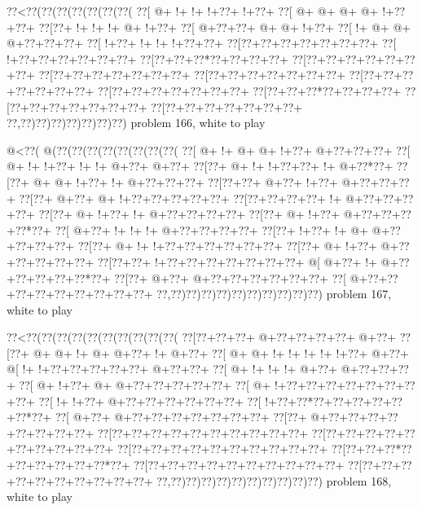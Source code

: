 \vbox{\vbox{\goo
\0??<\0??(\0??(\0??(\0??(\0??(\0??(\0??(
\0??[\- @+\- !+\- !+\- !+\0??+\- !+\0??+
\0??[\- @+\- @+\- @+\- @+\- !+\0??+\0??+
\0??[\0??+\- !+\- !+\- !+\- @+\- !+\0??+
\0??[\- @+\0??+\0??+\- @+\- @+\- !+\0??+
\0??[\- !+\- @+\- @+\- @+\0??+\0??+\0??+
\0??[\- !+\0??+\- !+\- !+\- !+\0??+\0??+
\0??[\0??+\0??+\0??+\0??+\0??+\0??+\0??+
\0??[\- !+\0??+\0??+\0??+\0??+\0??+\0??+
\0??[\0??+\0??+\0??*\0??+\0??+\0??+\0??+
\0??[\0??+\0??+\0??+\0??+\0??+\0??+\0??+
\0??[\0??+\0??+\0??+\0??+\0??+\0??+\0??+
\0??[\0??+\0??+\0??+\0??+\0??+\0??+\0??+
\0??[\0??+\0??+\0??+\0??+\0??+\0??+\0??+
\0??[\0??+\0??+\0??+\0??+\0??+\0??+\0??+
\0??[\0??+\0??+\0??*\0??+\0??+\0??+\0??+
\0??[\0??+\0??+\0??+\0??+\0??+\0??+\0??+
\0??[\0??+\0??+\0??+\0??+\0??+\0??+\0??+
\0??,\0??)\0??)\0??)\0??)\0??)\0??)\0??)
}
\hfil problem 166, white to play\hfil\break
}

\vbox{\vbox{\goo
\- @<\0??(\- @(\0??(\0??(\0??(\0??(\0??(\0??(\0??(\0??(
\0??[\- @+\- !+\- @+\- @+\- !+\0??+\- @+\0??+\0??+\0??+
\0??[\- @+\- !+\- !+\0??+\- !+\- !+\- @+\0??+\- @+\0??+
\0??[\0??+\- @+\- !+\- !+\0??+\0??+\- !+\- @+\0??*\0??+
\0??[\0??+\- @+\- @+\- !+\0??+\- !+\- @+\0??+\0??+\0??+
\0??[\0??+\0??+\- @+\0??+\- !+\0??+\- @+\0??+\0??+\0??+
\0??[\0??+\- @+\0??+\- @+\- !+\0??+\0??+\0??+\0??+\0??+
\0??[\0??+\0??+\0??+\0??+\- !+\- @+\0??+\0??+\0??+\0??+
\0??[\0??+\- @+\- !+\0??+\- !+\- @+\0??+\0??+\0??+\0??+
\0??[\0??+\- @+\- !+\0??+\- @+\0??+\0??+\0??+\0??*\0??+
\0??[\- @+\0??+\- !+\- !+\- !+\- @+\0??+\0??+\0??+\0??+
\0??[\0??+\- !+\0??+\- !+\- @+\- @+\0??+\0??+\0??+\0??+
\0??[\0??+\- @+\- !+\- !+\0??+\0??+\0??+\0??+\0??+\0??+
\0??[\0??+\- @+\- !+\0??+\- @+\0??+\0??+\0??+\0??+\0??+
\0??[\0??+\0??+\- !+\0??+\0??+\0??+\0??+\0??+\0??+\0??+
\- @[\- @+\0??+\- !+\- @+\0??+\0??+\0??+\0??+\0??*\0??+
\0??[\0??+\- @+\0??+\- @+\0??+\0??+\0??+\0??+\0??+\0??+
\0??[\- @+\0??+\0??+\0??+\0??+\0??+\0??+\0??+\0??+\0??+
\0??,\0??)\0??)\0??)\0??)\0??)\0??)\0??)\0??)\0??)\0??)
}
\hfil problem 167, white to play\hfil\break
}

\vbox{\vbox{\goo
\0??<\0??(\0??(\0??(\0??(\0??(\0??(\0??(\0??(\0??(\0??(
\0??[\0??+\0??+\0??+\- @+\0??+\0??+\0??+\0??+\- @+\0??+
\0??[\0??+\- @+\- @+\- !+\- @+\- @+\0??+\- !+\- @+\0??+
\0??[\- @+\- @+\- !+\- !+\- !+\- !+\- !+\0??+\- @+\0??+
\- @[\- !+\- !+\0??+\0??+\0??+\0??+\0??+\- @+\0??+\0??+
\0??[\- @+\- !+\- !+\- !+\- @+\0??+\- @+\0??+\0??+\0??+
\0??[\- @+\- !+\0??+\- @+\- @+\0??+\0??+\0??+\0??+\0??+
\0??[\- @+\- !+\0??+\0??+\0??+\0??+\0??+\0??+\0??+\0??+
\0??[\- !+\- !+\0??+\- @+\0??+\0??+\0??+\0??+\0??+\0??+
\0??[\- !+\0??+\0??*\0??+\0??+\0??+\0??+\0??+\0??*\0??+
\0??[\- @+\0??+\- @+\0??+\0??+\0??+\0??+\0??+\0??+\0??+
\0??[\0??+\- @+\0??+\0??+\0??+\0??+\0??+\0??+\0??+\0??+
\0??[\0??+\0??+\0??+\0??+\0??+\0??+\0??+\0??+\0??+\0??+
\0??[\0??+\0??+\0??+\0??+\0??+\0??+\0??+\0??+\0??+\0??+
\0??[\0??+\0??+\0??+\0??+\0??+\0??+\0??+\0??+\0??+\0??+
\0??[\0??+\0??+\0??*\0??+\0??+\0??+\0??+\0??+\0??*\0??+
\0??[\0??+\0??+\0??+\0??+\0??+\0??+\0??+\0??+\0??+\0??+
\0??[\0??+\0??+\0??+\0??+\0??+\0??+\0??+\0??+\0??+\0??+
\0??,\0??)\0??)\0??)\0??)\0??)\0??)\0??)\0??)\0??)\0??)
}
\hfil problem 168, white to play\hfil\break
}

